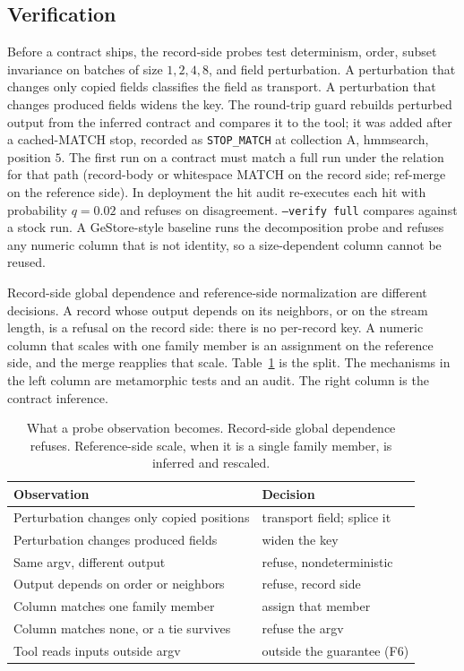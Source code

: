 \documentclass[letterpaper,twocolumn,10pt]{article}
\begin{document}
\subsection{Verification}
\label{sec:verify}

Before a contract ships, the record-side probes test determinism, order, subset invariance on batches of size
$1, 2, 4, 8$,
and field perturbation.
A perturbation that changes only copied fields classifies the field as transport.
A perturbation that changes produced fields widens the key.
The round-trip guard rebuilds perturbed output from the inferred contract and compares it to the tool; it was added after a cached-MATCH stop, recorded as \texttt{STOP\_MATCH} at collection A, hmmsearch, position
$5$.
The first run on a contract must match a full run under the relation for that path (record-body or whitespace MATCH on the record side; ref-merge on the reference side).
In deployment the hit audit re-executes each hit with probability
$q = 0.02$
and refuses on disagreement.
\texttt{--verify full} compares against a stock run.
A GeStore-style baseline runs the decomposition probe and refuses any numeric column that is not identity, so a size-dependent column cannot be reused.

Record-side global dependence and reference-side normalization are different decisions.
A record whose output depends on its neighbors, or on the stream length, is a refusal on the record side: there is no per-record key.
A numeric column that scales with one family member is an assignment on the reference side, and the merge reapplies that scale.
Table~\ref{tab:decide} is the split.
The mechanisms in the left column are metamorphic tests and an audit.
The right column is the contract inference.

\begin{table}[t]
\caption{What a probe observation becomes.
Record-side global dependence refuses.
Reference-side scale, when it is a single family member, is inferred and rescaled.}
\label{tab:decide}
\small
\begin{tabular}{@{}p{}p{}@{}}
\toprule
Observation & Decision \\
\midrule
Perturbation changes only copied positions & transport field; splice it \\
Perturbation changes produced fields & widen the key \\
Same argv, different output & refuse, nondeterministic \\
Output depends on order or neighbors & refuse, record side \\
Column matches one family member & assign that member \\
Column matches none, or a tie survives & refuse the argv \\
Tool reads inputs outside argv & outside the guarantee (F6) \\
\bottomrule
\end{tabular}
\end{table}
\end{document}
